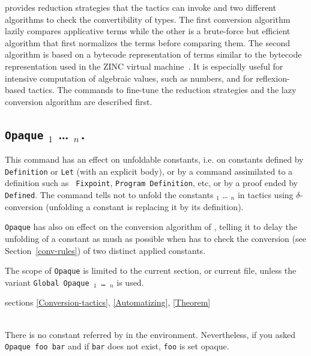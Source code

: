 {\Coq} provides reduction strategies that the tactics can invoke and
two different algorithms to check the convertibility of types.
The first conversion algorithm lazily
compares applicative terms while the other is a brute-force but efficient
algorithm that first normalizes the terms before comparing them.  The
second algorithm is based on a bytecode representation of terms
similar to the bytecode representation used in the ZINC virtual
machine~\cite{Leroy90}. It is especially useful for intensive
computation of algebraic values, such as numbers, and for reflexion-based
tactics. The commands to fine-tune the reduction strategies and the
lazy conversion algorithm are described first.

\subsection[{\tt Opaque} \qualid$_1$ {\ldots} \qualid$_n${\tt .}]{{\tt Opaque} \qualid$_1$ {\ldots} \qualid$_n${\tt .}\label{Opaque}}
This command has an effect on unfoldable constants, i.e. 
on constants defined by {\tt Definition} or {\tt Let} (with an explicit
body), or by a command assimilated to a definition such as {\tt
Fixpoint}, {\tt Program Definition}, etc, or by a proof ended by {\tt
Defined}. The command tells not to unfold
the constants {\qualid$_1$} {\ldots} {\qualid$_n$} in tactics using
$\delta$-conversion (unfolding a constant is replacing it by its
definition).

{\tt Opaque} has also on effect on the conversion algorithm of {\Coq},
telling it to delay the unfolding of a constant as mush as possible when
{\Coq} has to check the conversion (see Section~\ref{conv-rules})
of two distinct applied constants.

The scope of {\tt Opaque} is limited to the current section, or
current file, unless the variant {\tt Global Opaque \qualid$_1$ {\ldots}
\qualid$_n$} is used.

\SeeAlso sections \ref{Conversion-tactics}, \ref{Automatizing},
\ref{Theorem}

\begin{ErrMsgs}
\item {}\\
    There is no constant referred by {\qualid} in the environment.
    Nevertheless, if you asked \texttt{Opaque foo bar}
    and if \texttt{bar} does not exist, \texttt{foo} is set opaque.
\end{ErrMsgs}

